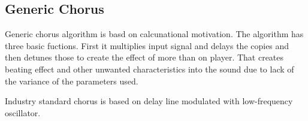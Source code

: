 \subsection{Generic Chorus}

Generic chorus algorithm is basd on calcunational motivation. The algorithm has three basic
fuctions. First it multiplies input signal and delays the copies and then detunes those to create
the effect of more than on player. That creates beating effect and other unwanted characteristics into
the sound due to lack of the variance of the parameters used. 

Industry standard chorus is based on delay line modulated with low-frequency oscillator. 